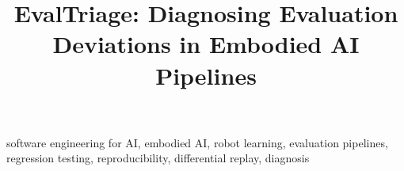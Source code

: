 \documentclass[10pt,conference]{IEEEtran}
\newif\ifshowrefs
\begin{document}
\title{EvalTriage: Diagnosing Evaluation Deviations in Embodied AI Pipelines
}

\author{}

\maketitle



\begin{IEEEkeywords}
software engineering for AI, embodied AI, robot learning, evaluation pipelines,
regression testing, reproducibility, differential replay, diagnosis
\end{IEEEkeywords}












\ifshowrefs
  \clearpage
  
  
\fi
\end{document}
